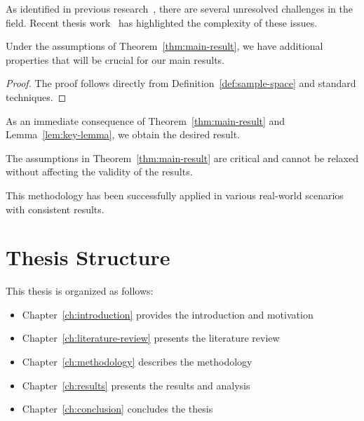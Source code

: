 As identified in previous research~\cite{sample2023}, there are several unresolved challenges in the field. Recent thesis work~\cite{thesis2022} has highlighted the complexity of these issues.

\begin{lemma}
\label{lem:key-lemma}
Under the assumptions of Theorem~\ref{thm:main-result}, we have additional properties that will be crucial for our main results.
\end{lemma}

\begin{proof}
The proof follows directly from Definition~\ref{def:sample-space} and standard techniques.
\end{proof}

\begin{corollary}
\label{cor:main-corollary}
As an immediate consequence of Theorem~\ref{thm:main-result} and Lemma~\ref{lem:key-lemma}, we obtain the desired result.
\end{corollary}

\lipsum[5-6]

\begin{block}[warning]
The assumptions in Theorem~\ref{thm:main-result} are critical and cannot be relaxed without affecting the validity of the results.
\end{block}

\begin{block}[note]
This methodology has been successfully applied in various real-world scenarios with consistent results.
\end{block}

\section{Thesis Structure}
\label{sec:thesis-structure}

This thesis is organized as follows:
\begin{itemize}
    \item Chapter~\ref{ch:introduction} provides the introduction and motivation
    \item Chapter~\ref{ch:literature-review} presents the literature review
    \item Chapter~\ref{ch:methodology} describes the methodology
    \item Chapter~\ref{ch:results} presents the results and analysis
    \item Chapter~\ref{ch:conclusion} concludes the thesis
\end{itemize}

\lipsum[7-8]
